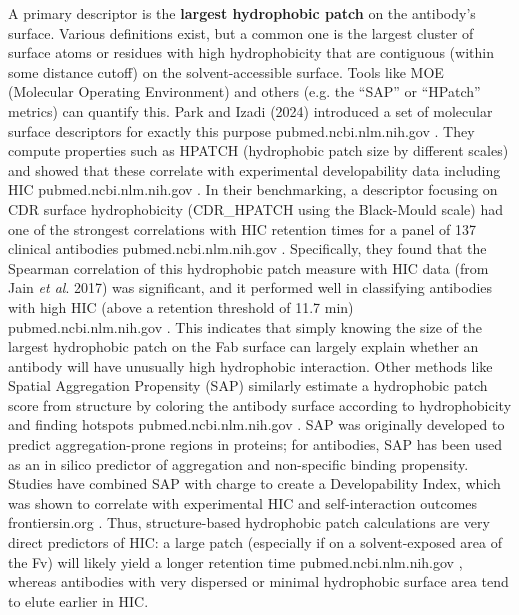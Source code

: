 \documentclass[12pt]{article}
\begin{document}
A primary descriptor is the \textbf{largest hydrophobic patch} on the antibody’s surface. Various definitions exist, but a common one is the largest cluster of surface atoms or residues with high hydrophobicity that are contiguous (within some distance cutoff) on the solvent-accessible surface. Tools like MOE (Molecular Operating Environment) and others (e.g. the “SAP” or “HPatch” metrics) can quantify this. Park and Izadi (2024) introduced a set of molecular surface descriptors for exactly this purpose
pubmed.ncbi.nlm.nih.gov
. They compute properties such as HPATCH (hydrophobic patch size by different scales) and showed that these correlate with experimental developability data including HIC
pubmed.ncbi.nlm.nih.gov
. In their benchmarking, a descriptor focusing on CDR surface hydrophobicity (CDR_HPATCH using the Black-Mould scale) had one of the strongest correlations with HIC retention times for a panel of 137 clinical antibodies
pubmed.ncbi.nlm.nih.gov
. Specifically, they found that the Spearman correlation of this hydrophobic patch measure with HIC data (from Jain \textit{et al}. 2017) was significant, and it performed well in classifying antibodies with high HIC (above a retention threshold of 11.7 min)
pubmed.ncbi.nlm.nih.gov
. This indicates that simply knowing the size of the largest hydrophobic patch on the Fab surface can largely explain whether an antibody will have unusually high hydrophobic interaction. Other methods like Spatial Aggregation Propensity (SAP) similarly estimate a hydrophobic patch score from structure by coloring the antibody surface according to hydrophobicity and finding hotspots
pubmed.ncbi.nlm.nih.gov
. SAP was originally developed to predict aggregation-prone regions in proteins; for antibodies, SAP has been used as an in silico predictor of aggregation and non-specific binding propensity. Studies have combined SAP with charge to create a Developability Index, which was shown to correlate with experimental HIC and self-interaction outcomes
frontiersin.org
. Thus, structure-based hydrophobic patch calculations are very direct predictors of HIC: a large patch (especially if on a solvent-exposed area of the Fv) will likely yield a longer retention time
pubmed.ncbi.nlm.nih.gov
, whereas antibodies with very dispersed or minimal hydrophobic surface area tend to elute earlier in HIC.
\end{document}
